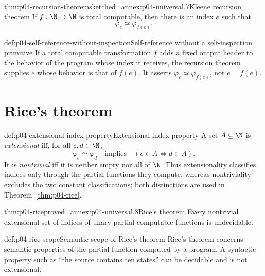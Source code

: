 \begin{hbtheorem}{thm:p04-recursion-theorem}{sketched=annex:p04-universal.7}{Kleene recursion theorem}
If \(f:\N\to\N\) is total computable, then there is an index \(e\) such
that
\[
  \varphi_e\simeq\varphi_{f(e)}.
\]
\end{hbtheorem}

\begin{hbexample}{def:p04-self-reference-without-inspection}{Self-reference without a self-inspection primitive}
If a total computable transformation \(f\) adds a fixed output header to the
behavior of the program whose index it receives, the recursion theorem
supplies \(e\) whose behavior is that of \(f(e)\).  It asserts
\(\varphi_e\simeq\varphi_{f(e)}\), not \(e=f(e)\).
\end{hbexample}

\section{Rice's theorem}
\label{sec:p04-rice}

\begin{hbdefinition}{def:p04-extensional-index-property}{Extensional index property}
A set \(A\subseteq\N\) is \emph{extensional} iff, for all \(e,d\in\N\),
\[
  \varphi_e\simeq\varphi_d
  \quad\text{implies}\quad
  (e\in A\Leftrightarrow d\in A).
\]
It is \emph{nontrivial} iff it is neither empty nor all of \(\N\).
Thus extensionality classifies indices only through the partial functions they
compute, whereas nontriviality excludes the two constant classifications; both
distinctions are used in Theorem~\ref{thm:p04-rice}.
\end{hbdefinition}

\begin{hbtheorem}{thm:p04-rice}{proved=annex:p04-universal.8}{Rice's theorem}
Every nontrivial extensional set of indices of unary partial computable
functions is undecidable.
\end{hbtheorem}

\begin{hbwarning}{def:p04-rice-scope}{Semantic scope of Rice's theorem}
Rice's theorem concerns semantic properties of the partial function computed
by a program.  A syntactic property such as ``the source contains ten states''
can be decidable and is not extensional.
\end{hbwarning}

